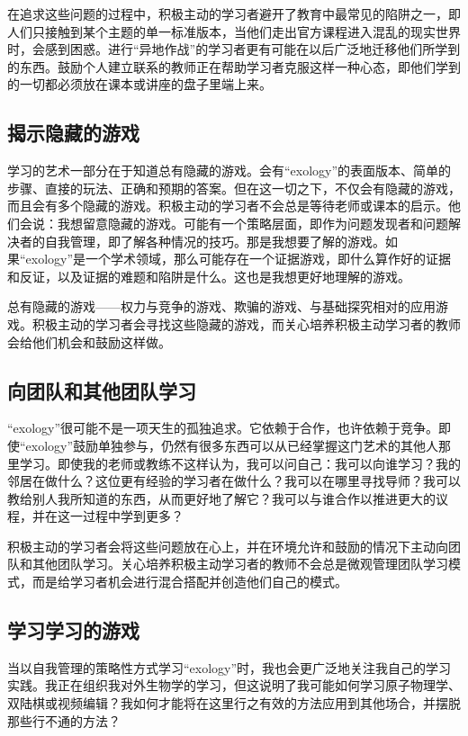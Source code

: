 在追求这些问题的过程中，积极主动的学习者避开了教育中最常见的陷阱之一，即人们只接触到某个主题的单一标准版本，当他们走出官方课程进入混乱的现实世界时，会感到困惑。进行“异地作战”的学习者更有可能在以后广泛地迁移他们所学到的东西。鼓励个人建立联系的教师正在帮助学习者克服这样一种心态，即他们学到的一切都必须放在课本或讲座的盘子里端上来。

\subsection*{揭示隐藏的游戏}

学习的艺术一部分在于知道总有隐藏的游戏。会有“exology”的表面版本、简单的步骤、直接的玩法、正确和预期的答案。但在这一切之下，不仅会有隐藏的游戏，而且会有多个隐藏的游戏。积极主动的学习者不会总是等待老师或课本的启示。他们会说：我想留意隐藏的游戏。可能有一个策略层面，即作为问题发现者和问题解决者的自我管理，即了解各种情况的技巧。那是我想要了解的游戏。如果“exology”是一个学术领域，那么可能存在一个证据游戏，即什么算作好的证据和反证，以及证据的难题和陷阱是什么。这也是我想更好地理解的游戏。

总有隐藏的游戏——权力与竞争的游戏、欺骗的游戏、与基础探究相对的应用游戏。积极主动的学习者会寻找这些隐藏的游戏，而关心培养积极主动学习者的教师会给他们机会和鼓励这样做。

\subsection*{向团队和其他团队学习}

“exology”很可能不是一项天生的孤独追求。它依赖于合作，也许依赖于竞争。即使“exology”鼓励单独参与，仍然有很多东西可以从已经掌握这门艺术的其他人那里学习。即使我的老师或教练不这样认为，我可以问自己：我可以向谁学习？我的邻居在做什么？这位更有经验的学习者在做什么？我可以在哪里寻找导师？我可以教给别人我所知道的东西，从而更好地了解它？我可以与谁合作以推进更大的议程，并在这一过程中学到更多？

积极主动的学习者会将这些问题放在心上，并在环境允许和鼓励的情况下主动向团队和其他团队学习。关心培养积极主动学习者的教师不会总是微观管理团队学习模式，而是给学习者机会进行混合搭配并创造他们自己的模式。

\subsection*{学习学习的游戏}

当以自我管理的策略性方式学习“exology”时，我也会更广泛地关注我自己的学习实践。我正在组织我对外生物学的学习，但这说明了我可能如何学习原子物理学、双陆棋或视频编辑？我如何才能将在这里行之有效的方法应用到其他场合，并摆脱那些行不通的方法？


